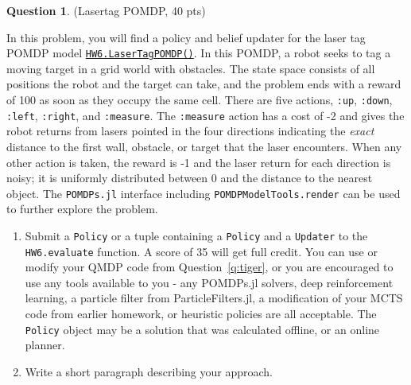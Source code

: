 \documentclass{article}
\theoremstyle{definition}
\newtheorem{question}[thm]{Question}
\begin{document}
\begin{question}
    (Lasertag POMDP, 40 pts)
    
    In this problem, you will find a policy and belief updater for the laser tag POMDP model \href{https://github.com/zsunberg/DMUStudent.jl/blob/e7301fcc46738b3b2aa517ab31aeb61624426479/src/HW6.jl#L31-L202}{\texttt{HW6.LaserTagPOMDP()}}.  In this POMDP, a robot seeks to tag a moving target in a grid world with obstacles. The state space consists of all positions the robot and the target can take, and the problem ends with a reward of 100 as soon as they occupy the same cell. There are five actions, \texttt{:up}, \texttt{:down}, \texttt{:left}, \texttt{:right}, and \texttt{:measure}. The \texttt{:measure} action has a cost of -2 and gives the robot returns from lasers pointed in the four directions indicating the \emph{exact} distance to the first wall, obstacle, or target that the laser encounters. When any other action is taken, the reward is -1 and the laser return for each direction is noisy; it is uniformly distributed between 0 and the distance to the nearest object. The \texttt{POMDPs.jl} interface including \texttt{POMDPModelTools.render} can be used to further explore the problem.

    \begin{enumerate}[label=\alph*)]
        \item Submit a \texttt{Policy} or a tuple containing a \texttt{Policy} and a \texttt{Updater} to the \texttt{HW6.evaluate} function. A score of 35 will get full credit. You can use or modify your QMDP code from Question~\ref{q:tiger}, or you are encouraged to use any tools available to you - any POMDPs.jl solvers, deep reinforcement learning, a particle filter from ParticleFilters.jl, a modification of your MCTS code from earlier homework, or heuristic policies are all acceptable. The \texttt{Policy} object may be a solution that was calculated offline, or an online planner.
        \item Write a short paragraph describing your approach.
    \end{enumerate}
\end{question}
\end{document}
